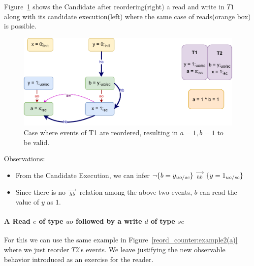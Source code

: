         Figure~\ref{reord_counter:example2(b)} shows the Candidate after reordering(right) a read and write in $T1$ along with its candidate execution(left) where the same case of reads(orange box) is possible. 
        \begin{figure}[H]
            \centering
            \includegraphics[scale=0.7]{5.InstructionReordering/4.ValidReorderingCandidate/Example3R(Rsc-Wuo,sc).pdf}
            \caption{Case where events of T1 are reordered, resulting in $a = 1, b = 1$ to be valid.}
            \label{reord_counter:example2(b)}
        \end{figure}
        
        Observations:
        \begin{itemize}
            \item From the Candidate Execution, we can infer $\neg\{b=y_{uo/sc}\}\stackrel{\longrightarrow}{_{hb}}\{y=1_{uo/sc}\}$
            \item Since there is no $\stackrel{\longrightarrow}{_{hb}}$ relation among the above two events, $b$ can read the value of $y$ as $1$.
        \end{itemize}

    \paragraph{A Read $e$ of type $uo$ followed by a write $d$ of type $sc$}

        For this we can use the same example in Figure~\ref{reord_counter:example2(a)} where we just reorder $T2$'s events.
        We leave justifying the new observable behavior introduced as an exercise for the reader.
    
        
